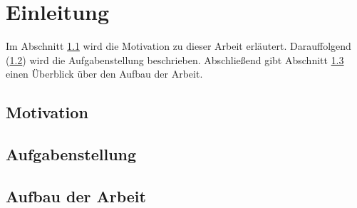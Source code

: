\chapter{Einleitung}
Im Abschnitt \ref{sec:Motivation} wird die Motivation zu dieser Arbeit
erläutert. Darauffolgend (\ref{sec:Aufgabenstellung}) wird die Aufgabenstellung
beschrieben. Abschließend gibt Abschnitt \ref{sec:Aufbau der Arbeit} einen Überblick über
den Aufbau der Arbeit.

\section{Motivation}
\label{sec:Motivation}


\section{Aufgabenstellung}
\label{sec:Aufgabenstellung}


\section{Aufbau der Arbeit}
\label{sec:Aufbau der Arbeit}